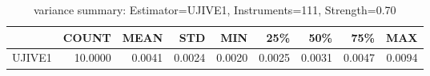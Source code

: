 \begin{table}[ht]
\centering
\caption{variance summary: Estimator=UJIVE1, Instruments=111, Strength=0.70}
\begin{tabular}{lrrrrrrrr}
\toprule
 & COUNT & MEAN & STD & MIN & 25\% & 50\% & 75\% & MAX \\
\midrule
UJIVE1 & 10.0000 & 0.0041 & 0.0024 & 0.0020 & 0.0025 & 0.0031 & 0.0047 & 0.0094 \\
\bottomrule
\end{tabular}
\end{table}
